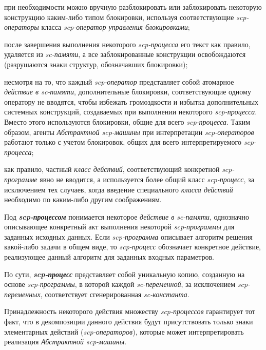 \begin{textitemize}
\item при необходимости можно вручную разблокировать или заблокировать некоторую конструкцию каким-либо типом блокировки, используя соответствующие \textit{scp-операторы} класса \textit{scp-оператор управления блокировками};
\item после завершения выполнения некоторого \textit{scp-процесса} его текст как правило, удаляется из \textit{\mbox{sc-памяти}}, а все заблокированные конструкции освобождаются (разрушаются знаки структур, обозначавших блокировки);
\item несмотря на то, что каждый \textit{scp-оператор} представляет собой атомарное \textit{действие в sc-памяти}, дополнительные блокировки, соответствующие одному оператору не вводятся, чтобы избежать громоздкости и избытка дополнительных системных конструкций, создаваемых при выполнении некоторого \textit{scp-процесса}. Вместо этого используются блокировки, общие для всего \textit{scp-процесса}. Таким образом, агенты \textit{Абстрактной scp-машины} при интерпретации \textit{scp-операторов} работают только с учетом блокировок, общих для всего интерпретируемого \textit{scp-процесса};
\item как правило, частный \textit{класс действий}, соответствующий конкретной \textit{scp-программе} явно не вводится, а используется более общий класс \textit{scp-процесс}, за исключением тех случаев, когда введение специального \textit{класса действий} необходимо по каким-либо другим соображениям.
\end{textitemize}

Под \textbf{\textit{scp-процессом}} понимается некоторое \textit{действие в sc-памяти}, однозначно описывающее конкретный акт выполнения некоторой \textit{scp-программы} для заданных исходных данных. Если \textit{scp-программа} описывает алгоритм решения какой-либо задачи в общем виде, то \textit{scp-процесс} обозначает конкретное действие, реализующее данный алгоритм для заданных входных параметров.

По сути, \textbf{\textit{scp-процесс}} представляет собой уникальную копию, созданную на основе \textit{scp-программы}, в которой каждой \textit{sc-переменной}, за исключением \textit{scp-переменных\scnrolesign}, соответствует сгенерированная \textit{sc-константа}.

Принадлежность некоторого действия множеству \textit{scp-процессов} гарантирует тот факт, что в декомпозиции данного действия будут присутствовать только знаки элементарных действий (\textit{scp-операторов}), которые может интерпретировать реализация \textit{Абстрактной scp-машины}.

